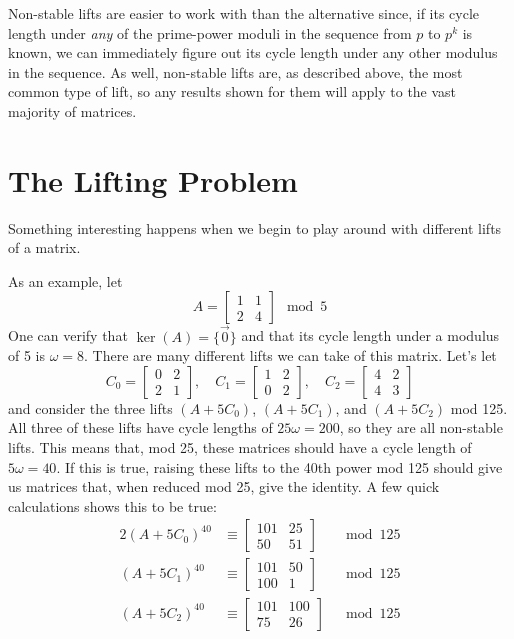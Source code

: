 \documentclass[a4paper, 12pt, reqno]{amsart}
\begin{document}
		Non-stable lifts are easier to work with than the alternative since, if its cycle length under \emph{any} of the prime-power moduli in the sequence from $p$ to $p^k$
		is known, we can immediately figure out its cycle length under any other modulus in the sequence. As well, non-stable lifts are, as described above, the most common
		type of lift, so any results shown for them will apply to the vast majority of matrices.
		
	\section{The Lifting Problem}
		\label{sec:liftingProblem}
		Something interesting happens when we begin to play around with different lifts of a matrix.
		
		As an example, let
		\[
			A = \begin{bmatrix}
				1 & 1 \\
				2 & 4
			\end{bmatrix} \mod{5}
		\]
		One can verify that $\ker(A) = \{\vec{0}\}$ and that its cycle length under a modulus of 5 is $\omega = 8$. There are many different lifts we can take of this matrix.
		Let's let
		\[
			C_0 = \begin{bmatrix}
				0 & 2 \\
				2 & 1
			\end{bmatrix},\quad
			C_1 = \begin{bmatrix}
				1 & 2 \\
				0 & 2
			\end{bmatrix},\quad
			C_2 = \begin{bmatrix}
				4 & 2 \\
				4 & 3
			\end{bmatrix}
		\]
		and consider the three lifts $(A + 5C_0)$, $(A + 5C_1)$, and $(A + 5C_2)$ mod 125. All three of these lifts have cycle lengths of $25\omega = 200$, so they are all
		non-stable lifts. This means that, mod 25, these matrices should have a cycle length of $5\omega = 40$. If this is true, raising these lifts to the 40th power mod
		125 should give us matrices that, when reduced mod 25, give the identity. A few quick calculations shows this to be true:
		\begin{alignat*}{2}
			(A + 5C_0)^{40} & \equiv \begin{bmatrix}
				101 & 25 \\
				 50 & 51
			\end{bmatrix} & \mod{125} \\
			(A + 5C_1)^{40} & \equiv \begin{bmatrix}
				101 & 50 \\
				100 &  1
			\end{bmatrix} & \mod{125} \\
			(A + 5C_2)^{40} & \equiv \begin{bmatrix}
				101 & 100 \\
				 75 &  26
			\end{bmatrix} & \mod{125}
		\end{alignat*}
		
\end{document}
